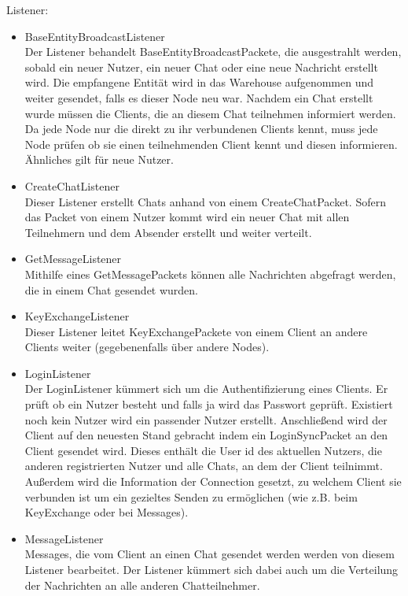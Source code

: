 \documentclass[a4paper]{article}
\theoremstyle{definition}
\begin{document}
    Listener:
    \begin{itemize}
        \item BaseEntityBroadcastListener\\
            Der Listener behandelt BaseEntityBroadcastPackete, die ausgestrahlt werden, sobald ein neuer Nutzer, ein neuer Chat oder eine neue Nachricht erstellt wird. Die empfangene Entität wird in das Warehouse aufgenommen und weiter gesendet, falls es dieser Node neu war.
            Nachdem ein Chat erstellt wurde müssen die Clients, die an diesem Chat teilnehmen informiert werden. Da jede Node nur die direkt zu ihr verbundenen Clients kennt, muss jede Node prüfen ob sie einen teilnehmenden Client kennt und diesen informieren. Ähnliches gilt für neue Nutzer.
        \item CreateChatListener\\
            Dieser Listener erstellt Chats anhand von einem CreateChatPacket. Sofern das Packet von einem Nutzer kommt wird ein neuer Chat mit allen Teilnehmern und dem Absender erstellt und weiter verteilt.
        \item GetMessageListener\\
            Mithilfe eines GetMessagePackets können alle Nachrichten abgefragt werden, die in einem Chat gesendet wurden.
        \item KeyExchangeListener\\
            Dieser Listener leitet KeyExchangePackete von einem Client an andere Clients weiter (gegebenenfalls über andere Nodes).
        \item LoginListener\\
            Der LoginListener kümmert sich um die Authentifizierung eines Clients. Er prüft ob ein Nutzer besteht und falls ja wird das Passwort geprüft. Existiert noch kein Nutzer wird ein passender Nutzer erstellt. Anschließend wird der Client auf den neuesten Stand gebracht indem ein LoginSyncPacket an den Client gesendet wird. Dieses enthält die User id des aktuellen Nutzers, die anderen registrierten Nutzer und alle Chats, an dem der Client teilnimmt. Außerdem wird die Information der Connection gesetzt, zu welchem Client sie verbunden ist um ein gezieltes Senden zu ermöglichen (wie z.B. beim KeyExchange oder bei Messages).
        \item MessageListener\\
            Messages, die vom Client an einen Chat gesendet werden werden von diesem Listener bearbeitet. Der Listener kümmert sich dabei auch um die Verteilung der Nachrichten an alle anderen Chatteilnehmer.

\end{itemize}
\end{document}
